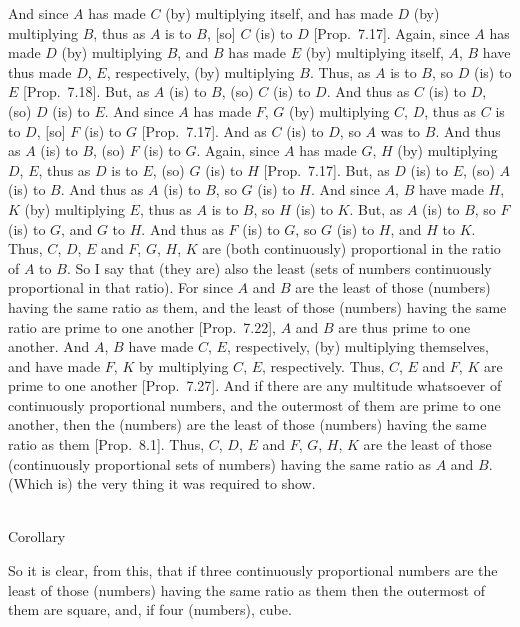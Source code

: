 \begin{Parallel}{}{}
{And since $A$ has made $C$ (by) multiplying itself, and has made $D$ (by)
multiplying $B$, thus as $A$ is to $B$, [so] $C$ (is) to $D$ [Prop.~7.17]. Again, since $A$ has made $D$
(by) multiplying $B$, and $B$ has made $E$ (by) multiplying itself,
 $A$, $B$ have thus made  $D$, $E$, respectively, (by)
multiplying $B$.  Thus, as $A$ is to $B$, so $D$ (is) to $E$ [Prop.~7.18]. But, as $A$ (is) to $B$, (so)
$C$ (is) to $D$. And thus as $C$ (is) to $D$, (so) $D$ (is) to $E$.
And since $A$ has made $F$, $G$ (by) multiplying $C$, $D$, thus as $C$ is to $D$, [so] $F$ (is) to $G$ [Prop.~7.17]. And as $C$ (is) to $D$, so
$A$ was to $B$. And thus as $A$ (is) to $B$, (so) $F$ (is) to $G$. Again,
since $A$ has made $G$, $H$ (by) multiplying $D$, $E$, thus as $D$ is to $E$, (so) $G$ (is) to $H$ [Prop.~7.17]. But, as $D$ (is) to $E$, (so) $A$ (is)
to $B$.  And thus as $A$ (is) to $B$, so $G$ (is) to $H$. And since
$A$, $B$ have made $H$, $K$ (by) multiplying
$E$, thus as $A$ is to $B$, so $H$ (is) to $K$. But, as $A$ (is) to $B$, so
$F$ (is) to $G$, and $G$ to $H$.  And thus as $F$ (is) to $G$, so $G$ (is)
to $H$, and $H$ to $K$. Thus, $C$, $D$, $E$ and $F$, $G$, $H$, $K$
are (both continuously) proportional in the ratio of $A$ to $B$. So I
say that (they are) also the least (sets of numbers continuously proportional in that
ratio). For since $A$ and $B$ are the least of those (numbers) having the
same ratio as them, and the least of those (numbers) having the same
ratio are prime to one another [Prop.~7.22],
$A$ and $B$ are thus prime to one another. And  $A$, $B$
have  made  $C$, $E$, respectively, (by) multiplying themselves, and have made $F$, $K$ by multiplying $C$, $E$, respectively. Thus,
$C$, $E$ and $F$, $K$ are prime to one another [Prop.~7.27]. And if there are any multitude whatsoever of continuously  proportional numbers, and the outermost
of them are prime to one another,  then the (numbers)  are the least of those
(numbers) having the same ratio as them [Prop.~8.1].
Thus, $C$, $D$, $E$ and $F$, $G$, $H$, $K$ are the least of those
(continuously proportional sets of numbers) having the same ratio as $A$ and $B$. (Which is) the very thing it was required to show.\\~\\

\begin{center}
{\large Corollary}
\end{center}\vspace*{-7pt}

So  it is clear, from this,  that if three continuously proportional numbers are the
least of those (numbers) having the same ratio as them then the outermost
of them are square, and, if four (numbers), cube.}
\end{Parallel}

